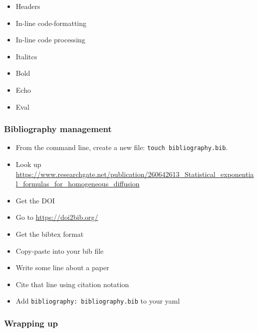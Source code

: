 \documentclass[
]{book}
\providecommand{\tightlist}{%
  \setlength{\itemsep}{0pt}\setlength{\parskip}{0pt}}
\begin{document}
\begin{itemize}
\tightlist
\item
  Headers\\
\item
  In-line code-formatting\\
\item
  In-line code processing\\
\item
  Italitcs\\
\item
  Bold\\
\item
  Echo\\
\item
  Eval
\end{itemize}

\hypertarget{bibliography-management}{%
\subsubsection*{Bibliography management}\label{bibliography-management}}

\begin{itemize}
\tightlist
\item
  From the command line, create a new file: \texttt{touch\ bibliography.bib}.\\
\item
  Look up \url{https://www.researchgate.net/publication/260642613_Statistical_exponential_formulas_for_homogeneous_diffusion}\\
\item
  Get the DOI\\
\item
  Go to \url{https://doi2bib.org/}\\
\item
  Get the bibtex format\\
\item
  Copy-paste into your bib file\\
\item
  Write some line about a paper\\
\item
  Cite that line using citation notation\\
\item
  Add \texttt{bibliography:\ bibliography.bib} to your yaml
\end{itemize}

\hypertarget{wrapping-up}{%
\subsubsection*{Wrapping up}\label{wrapping-up}}
\end{document}
